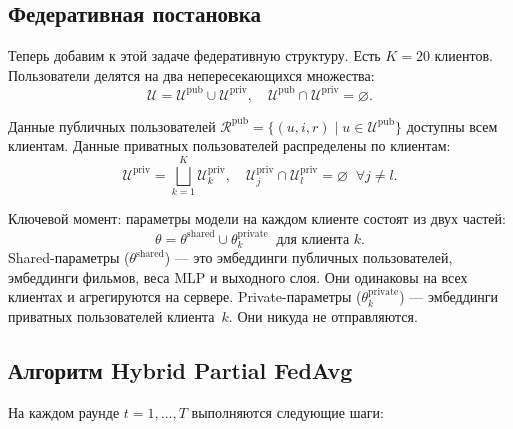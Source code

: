 \documentclass[14pt,a4paper]{extarticle}
\begin{document}
\subsection{Федеративная постановка}

Теперь добавим к этой задаче федеративную структуру. Есть $K = 20$ клиентов. Пользователи делятся на два непересекающихся множества:
\begin{equation}
\mathcal{U} = \mathcal{U}^{\text{pub}} \cup \mathcal{U}^{\text{priv}}, \quad \mathcal{U}^{\text{pub}} \cap \mathcal{U}^{\text{priv}} = \varnothing.
\end{equation}

Данные публичных пользователей $\mathcal{R}^{\text{pub}} = \{(u, i, r) \mid u \in \mathcal{U}^{\text{pub}}\}$ доступны всем клиентам. Данные приватных пользователей распределены по клиентам:
\begin{equation}
\mathcal{U}^{\text{priv}} = \bigsqcup_{k=1}^{K} \mathcal{U}_k^{\text{priv}}, \quad \mathcal{U}_j^{\text{priv}} \cap \mathcal{U}_l^{\text{priv}} = \varnothing \;\; \forall j \neq l.
\end{equation}

Ключевой момент: параметры модели на каждом клиенте состоят из двух частей:
\begin{equation}
\theta = \theta^{\text{shared}} \cup \theta^{\text{private}}_k \;\;\text{для клиента } k.
\end{equation}
Shared-параметры ($\theta^{\text{shared}}$) --- это эмбеддинги публичных пользователей, эмбеддинги фильмов, веса MLP и выходного слоя. Они одинаковы на всех клиентах и агрегируются на сервере. Private-параметры ($\theta^{\text{private}}_k$) --- эмбеддинги приватных пользователей клиента~$k$. Они никуда не отправляются.


\subsection{Алгоритм Hybrid Partial FedAvg}

На каждом раунде $t = 1, \ldots, T$ выполняются следующие шаги:
\end{document}
